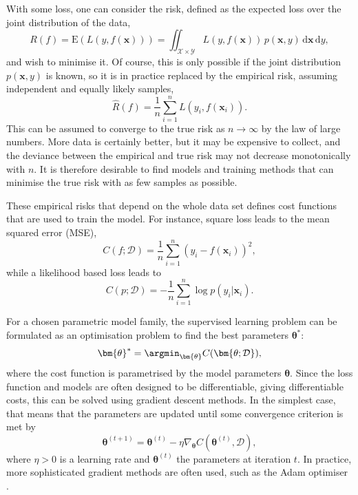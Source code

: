 With some loss, one can consider the risk, defined as the expected loss over the joint distribution of the data,
\begin{equation}
    R(f)
    = \text{E}(L(y, f(\bm{x})))
    = \iint_{\mathcal{X}\times\mathcal{Y}} L(y, f(\bm{x})) \, p(\bm{x}, y) \, \mathrm{d}\bm{x} \, \mathrm{d}y,
    \label{eq:risk}
\end{equation}
and wish to minimise it.
Of course, this is only possible if the joint distribution $p(\bm{x}, y)$ is known, so it is in practice replaced by the empirical risk, assuming independent and equally likely samples,
\begin{equation}
    \label{eq:empirical_risk}
    \hat{R}(f) = \frac{1}{n} \sum_{i=1}^n L(y_i, f(\bm{x}_i)).
\end{equation}
This can be assumed to converge to the true risk as $n\to\infty$ by the law of large numbers.
More data is certainly better, but it may be expensive to collect, and the deviance between the empirical and true risk may not decrease monotonically with $n$.
It is therefore desirable to find models and training methods that can minimise the true risk with as few samples as possible.

These empirical risks that depend on the whole data set defines cost functions that are used to train the model.
For instance, square loss leads to the mean squared error (MSE),
\begin{equation}
    C(f;\mathcal{D}) = \frac{1}{n} \sum_{i=1}^n (y_i - f(\bm{x}_i))^2,
\end{equation}
while a likelihood based loss leads to
\begin{equation}
    C(p;\mathcal{D}) = -\frac{1}{n} \sum_{i=1}^n \log p(y_i|\bm{x}_i).
\end{equation}

For a chosen parametric model family, the supervised learning problem can be formulated as an optimisation problem to find the best parameters $\bm{\theta}^*$:
\begin{equation}
    \bm{\theta}^* = \argmin_{\bm{\theta}} C(\bm{\theta; \mathcal{D}}),
\end{equation}
where the cost function is parametrised by the model parameters $\bm{\theta}$.
Since the loss function and models are often designed to be differentiable, giving differentiable costs, this can be solved using gradient descent methods.
In the simplest case, that means that the parameters are updated until some convergence criterion is met by
\begin{equation}
    \bm{\theta}^{(t+1)} = \bm{\theta}^{(t)} - \eta \nabla_{\bm{\theta}} C(\bm{\theta}^{(t)}, \mathcal{D}),
\end{equation}
where $\eta>0$ is a learning rate and $\bm{\theta}^{(t)}$ the parameters at iteration $t$.
In practice, more sophisticated gradient methods are often used, such as the Adam optimiser \cite{adamoptimiser}.

